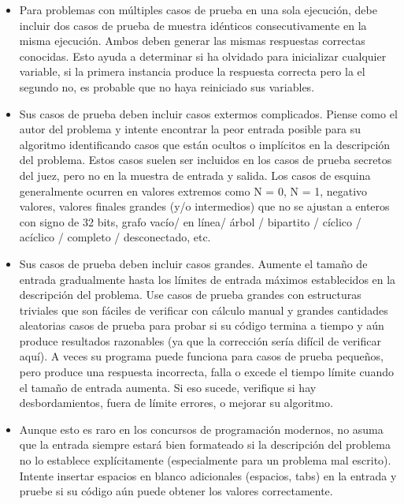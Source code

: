 \begin{itemize}
	\item Para problemas con múltiples casos de prueba en una sola ejecución, debe
	incluir dos casos de prueba de muestra idénticos consecutivamente en la misma ejecución. Ambos deben generar las mismas respuestas correctas conocidas. Esto ayuda a determinar si ha olvidado
	para inicializar cualquier variable, si la primera instancia produce la respuesta correcta pero la
	el segundo no, es probable que no haya reiniciado sus variables.
	\item Sus casos de prueba deben incluir casos extermos complicados. Piense como el autor del problema y intente encontrar la peor entrada posible para su algoritmo identificando casos
	que están ocultos o implícitos en la descripción del problema. Estos casos suelen ser
	incluidos en los casos de prueba secretos del juez, pero no en la muestra de entrada y salida.
	Los casos de esquina generalmente ocurren en valores extremos como N = 0, N = 1, negativo
	valores, valores finales grandes (y/o intermedios) que no se ajustan a enteros con signo de 32 bits, grafo vacío/ en línea/ árbol / bipartito / cíclico / acíclico / completo / desconectado, etc.
	
	\item Sus casos de prueba deben incluir casos grandes. Aumente el tamaño de entrada gradualmente hasta los límites de entrada máximos establecidos en la descripción del problema. Use casos de prueba grandes con estructuras triviales que son fáciles de verificar con cálculo manual y grandes cantidades aleatorias casos de prueba para probar si su código termina a tiempo y aún produce resultados razonables (ya que la corrección sería difícil de verificar aquí). A veces su programa puede funciona para casos de prueba pequeños, pero produce una respuesta incorrecta, falla o excede el tiempo límite cuando el tamaño de entrada aumenta. Si eso sucede, verifique si hay desbordamientos, fuera de límite errores, o mejorar su algoritmo.
	
	\item Aunque esto es raro en los concursos de programación modernos, no asuma que la entrada
	siempre estará bien formateado si la descripción del problema no lo establece explícitamente
	(especialmente para un problema mal escrito). Intente insertar espacios en blanco adicionales (espacios, tabs) en la entrada y pruebe si su código aún puede obtener los valores correctamente.
	
\end{itemize}